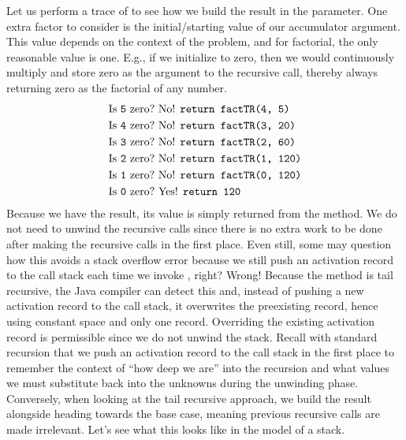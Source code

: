 Let us perform a trace of  to see how we build the result in the  parameter. One extra factor to consider is the initial/starting value of our accumulator argument. This value depends on the context of the problem, and for factorial, the only reasonable value is one. E.g., if we initialize  to zero, then we would continuously multiply and store zero as the argument to the recursive call, thereby always returning zero as the factorial of any number.
\begin{align*}
    \text{Is }\texttt{5} \text{ zero?} &\text{ No! }\texttt{return factTR(4, 5)}\\
    \text{Is }\texttt{4} \text{ zero?} &\text{ No! }\texttt{return factTR(3, 20)}\\
    \text{Is }\texttt{3} \text{ zero?} &\text{ No! }\texttt{return factTR(2, 60)}\\
    \text{Is }\texttt{2} \text{ zero?} &\text{ No! }\texttt{return factTR(1, 120)}\\
    \text{Is }\texttt{1} \text{ zero?} &\text{ No! }\texttt{return factTR(0, 120)}\\
    \text{Is }\texttt{0} \text{ zero?} &\text{ Yes! }\texttt{return 120}
\end{align*}
Because we have the result, its value is simply returned from the method. We do not need to unwind the recursive calls since there is no extra work to be done after making the recursive calls in the first place. Even still, some may question how this avoids a stack overflow error because we still push an activation record to the call stack each time we invoke , right? Wrong! Because the method is tail recursive, the Java compiler can detect this and, instead of pushing a new activation record to the call stack, it overwrites the preexisting record, hence using constant space and only one record. Overriding the existing activation record is permissible since we do not unwind the stack. Recall with standard recursion that we push an activation record to the call stack in the first place to remember the context of ``how deep we are'' into the recursion and what values we must substitute back into the unknowns during the unwinding phase. Conversely, when looking at the tail recursive approach, we build the result alongside heading towards the base case, meaning previous recursive calls are made irrelevant. Let's see what this looks like in the model of a stack.
